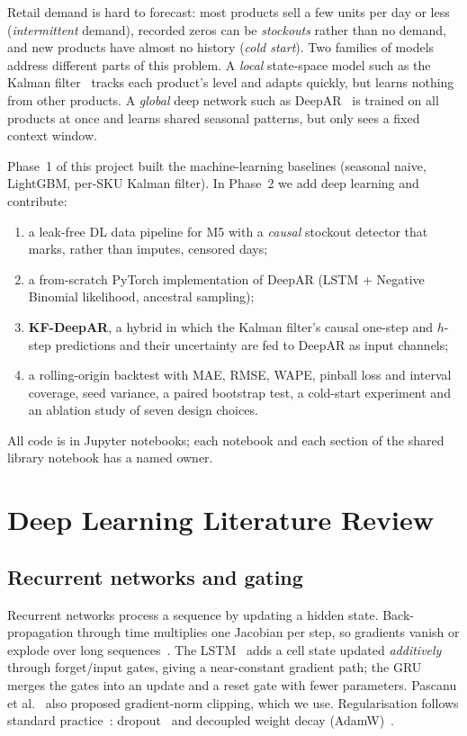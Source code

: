 \documentclass[conference]{IEEEtran}
\begin{document}
Retail demand is hard to forecast: most products sell a few units per day or less (\emph{intermittent} demand), recorded
zeros can be \emph{stockouts} rather than no demand, and new products have almost no history (\emph{cold start}).
Two families of models address different parts of this problem. A \emph{local} state-space model such as the Kalman
filter~\cite{kalman1960} tracks each product's level and adapts quickly, but learns nothing from other products.
A \emph{global} deep network such as DeepAR~\cite{salinas2020deepar} is trained on all products at once and learns shared
seasonal patterns, but only sees a fixed context window.

Phase~1 of this project built the machine-learning baselines (seasonal naive, LightGBM, per-SKU Kalman filter).
In Phase~2 we add deep learning and contribute:
\begin{enumerate}
  \item a leak-free DL data pipeline for M5 with a \emph{causal} stockout detector that marks, rather than imputes, censored days;
  \item a from-scratch PyTorch implementation of DeepAR (LSTM + Negative Binomial likelihood, ancestral sampling);
  \item \textbf{KF-DeepAR}, a hybrid in which the Kalman filter's causal one-step and $h$-step predictions and their
        uncertainty are fed to DeepAR as input channels;
  \item a rolling-origin backtest with MAE, RMSE, WAPE, pinball loss and interval coverage, seed variance, a paired bootstrap
        test, a cold-start experiment and an ablation study of seven design choices.
\end{enumerate}
All code is in Jupyter notebooks; each notebook and each section of the shared library notebook has a named owner.

\section{Deep Learning Literature Review}
\subsection{Recurrent networks and gating}
Recurrent networks process a sequence by updating a hidden state. Back-propagation through time multiplies one Jacobian per step,
so gradients vanish or explode over long sequences~\cite{pascanu2013difficulty}. The LSTM~\cite{hochreiter1997lstm} adds a cell state
updated \emph{additively} through forget/input gates, giving a near-constant gradient path; the GRU~\cite{cho2014gru} merges the gates
into an update and a reset gate with fewer parameters. Pascanu et al.~\cite{pascanu2013difficulty} also proposed gradient-norm clipping,
which we use. Regularisation follows standard practice~\cite{goodfellow2016dl,prince2023udl}: dropout~\cite{srivastava2014dropout} and
decoupled weight decay (AdamW)~\cite{loshchilov2019adamw,kingma2015adam}.
\end{document}
